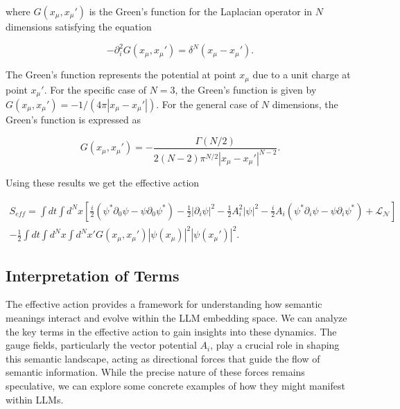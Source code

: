 \documentclass[prd,amsmath,amssymb,12pt]{revtex4}
\begin{document}
\noindent
where $G(x_{\mu}, x_{\mu}')$ is the Green's function for the Laplacian operator in $N$ dimensions satisfying the equation

\begin{equation}
   -\partial_i^2 G(x_{\mu}, x_{\mu}') = \delta^N(x_{\mu} - x_{\mu}').
\end{equation}

\noindent
The Green's function
represents the potential at point $x_{\mu}$ due to a unit charge at point $x_{\mu}'$. For the specific case of $N = 3$,
the Green's function is given by $G(x_{\mu}, x_{\mu}') = -1/(4\pi |x_{\mu}-x_{\mu}'|)$. For the general case of $N$
dimensions,
the Green's function is expressed as

\begin{equation}
G(x_{\mu},x_{\mu}') = -\frac{\Gamma\left(N/2\right)}{2(N-2)\pi^{N/2} |x_{\mu}-x_{\mu}'|^{N-2}}.
\end{equation}

\noindent
Using these results we get
the effective action

\begin{equation}
    \begin{split}
    S_{eff} = \int dt \int d^{N}x \left[\frac{i}{2} \left( \psi^* \partial_0 \psi
    - \psi \partial_0 \psi^* \right) - \frac{1}{2}  |\partial_i \psi|^2
    - \frac{1}{2}  A_i^2 |\psi|^2
    - \frac{i}{2}  A_i (\psi^* \partial_i \psi - \psi \partial_i \psi^*) + \mathcal{L_{N}}\right] \\
    -\frac{1}{2} \int dt \int d^{N}x \int d^{N}x' G(x_{\mu}, x_{\mu}') |\psi(x_{\mu})|^2 |\psi(x_{\mu}')|^2.
    \end{split}
\end{equation}

\subsection{Interpretation of Terms}

The effective action provides a framework for understanding how semantic meanings interact and evolve
within the LLM embedding space. We can analyze the key terms in the effective action to gain insights into these
dynamics. The gauge fields, particularly the vector potential $A_i$, play a crucial role in shaping this semantic
landscape, acting as directional forces that guide the flow of semantic information. While the precise nature of
these forces remains speculative, we can explore some concrete examples of how they might manifest within LLMs.
\end{document}
